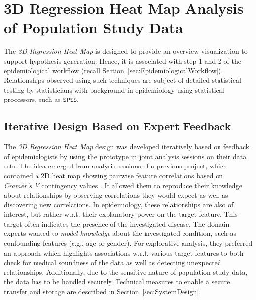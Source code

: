 \documentclass[journal]{style/vgtc} 			          %
\newcommand{\design}[1]{\textcolor{orange}{#1}}
\begin{document}
\section{3D Regression Heat Map Analysis of Population Study Data}
The \emph{3D Regression Heat Map} is designed to provide an overview visualization to support hypothesis generation.
Hence, it is associated with step 1 and 2 of the epidemiological workflow (recall Section~\ref{sec:EpidemiologicalWorkflow}).
Relationships observed using such techniques are subject of detailed statistical testing by statisticians with background in epidemiology using statistical processors, such as \texttt{SPSS}.
\subsection{Iterative Design Based on Expert Feedback}
The \emph{3D Regression Heat Map} design was developed iteratively based on feedback of epidemiologists by using the prototype in joint analysis sessions on their data sets.
The idea emerged from analysis sessions of a previous project, which contained a 2D heat map showing pairwise feature correlations based on \emph{Cram\'{e}r's V} contingency values \cite{Klemm2014VIS}.
It allowed them to reproduce their knowledge about relationships by observing correlations they would expect as well as discovering new correlations.
In epidemiology, these relationships are also of interest, but rather w.r.t. their explanatory power on the target feature.
This target often indicates the presence of the investigated disease.
The domain experts wanted to \emph{model knowledge} about the investigated condition, such as confounding features (e.g., age or gender).
For explorative analysis, they preferred an approach which highlights associations w.r.t. various target features to both check for medical soundness of the data as well as detecting unexpected relationships.
Additionally, due to the sensitive nature of population study data, the data has to be handled securely.
Technical measures to enable a secure transfer and storage are described in Section~\ref{sec:SystemDesign}.
\end{document}
